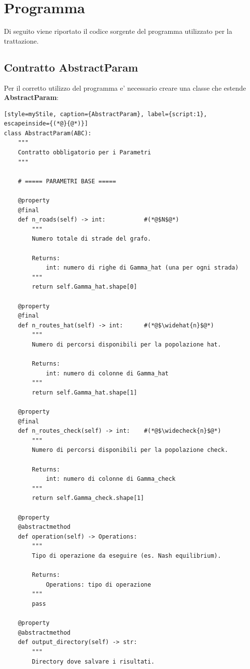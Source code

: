 \section{Programma}
\label{sec:Programma}

Di seguito viene riportato il codice sorgente del programma utilizzato per la trattazione.

\subsection{Contratto AbstractParam}
\label{subsec:AbstractParam}

Per il corretto utilizzo del programma e' necessario creare una classe che estende \textbf{AbstractParam}:
\begin{lstlisting}[style=myStile, caption={AbstractParam}, label={script:1}, escapeinside={(*@}{@*)}]
class AbstractParam(ABC):
    """
    Contratto obbligatorio per i Parametri
    """

    # ===== PARAMETRI BASE =====
    
    @property
    @final
    def n_roads(self) -> int:           #(*@$N$@*)
        """
        Numero totale di strade del grafo.
        
        Returns:
            int: numero di righe di Gamma_hat (una per ogni strada)
        """
        return self.Gamma_hat.shape[0]

    @property
    @final
    def n_routes_hat(self) -> int:      #(*@$\widehat{n}$@*)
        """
        Numero di percorsi disponibili per la popolazione hat.
        
        Returns:
            int: numero di colonne di Gamma_hat
        """
        return self.Gamma_hat.shape[1]

    @property
    @final
    def n_routes_check(self) -> int:    #(*@$\widecheck{n}$@*)
        """
        Numero di percorsi disponibili per la popolazione check.
        
        Returns:
            int: numero di colonne di Gamma_check
        """
        return self.Gamma_check.shape[1]

    @property
    @abstractmethod
    def operation(self) -> Operations:
        """
        Tipo di operazione da eseguire (es. Nash equilibrium).
        
        Returns:
            Operations: tipo di operazione
        """
        pass

    @property
    @abstractmethod
    def output_directory(self) -> str:
        """
        Directory dove salvare i risultati.
        

\end{lstlisting}
